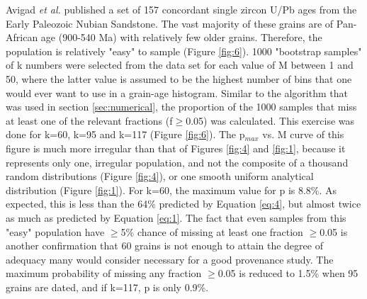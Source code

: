 \documentclass[12]{article}
\begin{document}
Avigad  {\it  et  al.}   \cite{avigad2003}  published  a  set  of  157
concordant  single zircon U/Pb  ages from  the Early  Paleozoic Nubian
Sandstone.  The vast  majority of these grains are  of Pan-African age
(900-540  Ma)  with  relatively  few  older  grains.   Therefore,  the
population is relatively "easy"  to sample (Figure \ref{fig:6}).  1000
"bootstrap samples" of  k numbers were selected from  the data set for
each value of M between 1 and 50, where the latter value is assumed to
be the  highest number of bins  that one would  ever want to use  in a
grain-age  histogram.   Similar to  the  algorithm  that  was used  in
section \ref{sec:numerical},  the proportion of the  1000 samples that
miss  at  least  one  of  the  relevant  fractions  (f$\geq$0.05)  was
calculated.  This exercise  was done for k=60, k=95  and k=117 (Figure
\ref{fig:6}).  The p$_{max}$ vs.  M  curve of this figure is much more
irregular than that of Figures \ref{fig:4} and \ref{fig:1}, because it
represents only one, irregular population,  and not the composite of a
thousand  random  distributions (Figure  \ref{fig:4}),  or one  smooth
uniform analytical  distribution (Figure \ref{fig:1}).   For k=60, the
maximum value for p is 8.8\%.  As expected, this is less than the 64\%
predicted  by  Equation  \ref{eq:4},  but  almost  twice  as  much  as
predicted  by Equation \ref{eq:1}.   The fact  that even  samples from
this "easy" population  have $\geq$5\% chance of missing  at least one
fraction  $\geq$0.05 is  another confirmation  that 60  grains  is not
enough to attain the degree  of adequacy many would consider necessary
for a good  provenance study.  The maximum probability  of missing any
fraction $\geq$0.05 is reduced to  1.5\% when 95 grains are dated, and
if k=117, p is only 0.9\%.
\end{document}
